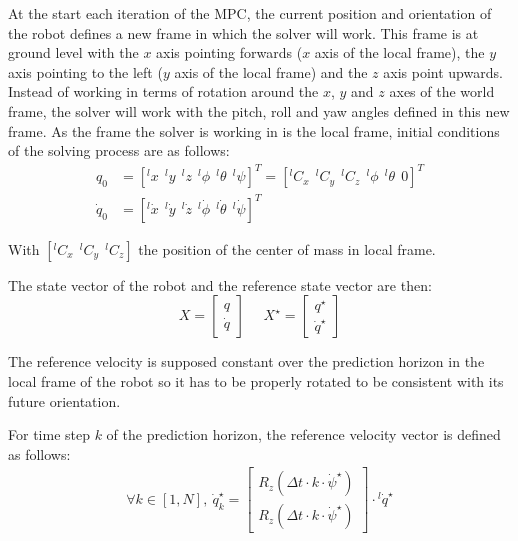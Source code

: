 \documentclass[a4paper,11pt]{article}
\begin{document}
At the start each iteration of the MPC, the current position and orientation of the robot defines a new frame in which the solver will work. This frame is at ground level with the $x$ axis pointing forwards ($x$ axis of the local frame), the $y$ axis pointing to the left ($y$ axis of the local frame) and the $z$ axis point upwards. Instead of working in terms of rotation around the $x$, $y$ and $z$ axes of the world frame, the solver will work with the pitch, roll and yaw angles defined in this new frame. As the frame the solver is working in is the local frame, initial conditions of the solving process are as follows:
\begin{align}
q_0 &= [{}^l\!x ~~ {}^l\!y ~~ {}^l\!z ~~ {}^l\! \phi ~~ {}^l\! \theta ~~ {}^l\! \psi ]^T = [ {}^l\!C_x ~~ {}^l\!C_y ~~ {}^l\!C_z ~~ {}^l\! \phi ~~ {}^l\! \theta ~~ 0]^T \\
\dot q_0 &= [{}^l\! \dot x ~~ {}^l\! \dot y ~~ {}^l\! \dot z ~~ {}^l\! \dot \phi ~~ {}^l\! \dot \theta ~~ {}^l\! \dot \psi ]^T
\end{align}

With $[{}^l\! C_x ~~ {}^l\! C_y ~~ {}^l\! C_z ]$ the position of the center of mass in local frame.

The state vector of the robot and the reference state vector are then: 
\begin{equation}X = \begin{bmatrix} q \\ \dot q \end{bmatrix} \text{~~~~}X^\star = \begin{bmatrix} q^{\star} \\ \dot q^{\star} \end{bmatrix}\end{equation}

The reference velocity is supposed constant over the prediction horizon in the local frame of the robot so it has to be properly rotated to be consistent with its future orientation.

For time step $k$ of the prediction horizon, the reference velocity vector is defined as follows:
\begin{align}
\forall k \in [1, N], ~ \dot q_k^\star = \begin{bmatrix} R_z(\Delta t \cdot k \cdot \dot \psi^\star) \\ R_z(\Delta t \cdot k \cdot \dot \psi^\star) \end{bmatrix} \cdot {}^l\! \dot q^\star
\end{align}
\end{document}
